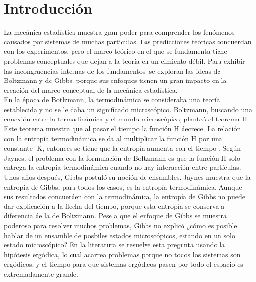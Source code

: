 \chapter{Introducción} 

La mecánica estadística muestra gran poder para comprender los fenómenos causados por sistemas de muchas partículas. Las predicciones teóricas concuerdan con los experimentos, pero el marco teórico en el que se fundamenta tiene problemas conceptuales que dejan a la teoría en un cimiento débil.  Para exhibir las incongruencias internas de los fundamentos, se exploran las ideas de Boltzmann y de Gibbs, porque sus enfoques tienen un gran impacto en la creación del marco conceptual de la mecánica estadística.
\\ 
En la época de Botlzmann, la termodinámica se consideraba una teoría establecida y no se le daba un significado microscópico. Boltzmann, buscando una conexión entre la termodinámica y el mundo microscópico, planteó el teorema H. Este teorema muestra que al pasar el tiempo la función H decrece. La relación con la entropía termodinámica se da al multiplicar la función H por una constante -K, entonces se tiene que la entropía aumenta con el tiempo \cite{Ehrenfest}. Según Jaynes, el problema con la formulación de Boltzmann es que la función H solo entrega la entropía termodinámica cuando no hay interacción entre partículas.
\\
Unos años después, Gibbs postuló su noción de ensambles. Jaynes muestra que la entropía de Gibbs, para todos los casos, es la entropía termodinámica. Aunque sus resultados concuerden con la termodinámica, la entropía de Gibbs no puede dar explicación a la flecha del tiempo, porque esta entropía se conserva a diferencia de la de Boltzmann. Pese a que el enfoque de Gibbs se muestra poderoso para resolver muchos problemas, Gibbs no explicó ¿cómo es posible hablar de un ensamble de posbiles estados microscópicos, estando en un solo estado microscópico? En la literatura se resuelve esta pregunta usando la hipótesis ergódica, lo cual acarrea problemas porque no todos los sistemas son ergódicos; y el tiempo para que sistemas ergódicos pasen por todo el espacio es extremadamente grande. 
